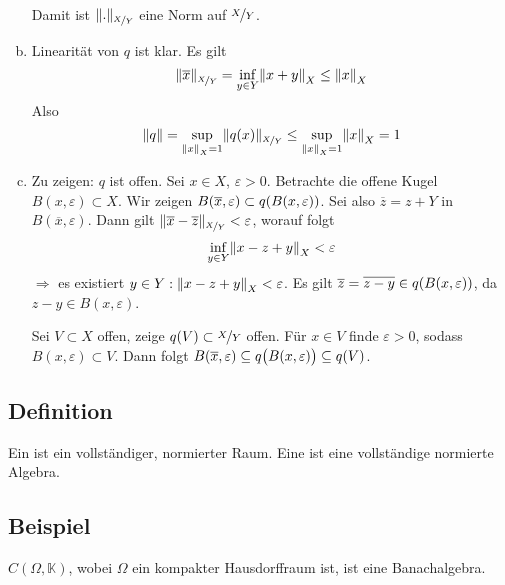\begin{enumerate}[a)]
\begin{align*}
	\end{align*}
	Damit ist $\norm[\nicefrac{X}{Y}]{.}$ eine Norm auf $\nicefrac{X}{Y}$.
	\item Linearität von $q$ ist klar. Es gilt
	\[
		\norm[\nicefrac{X}{Y}]{\overline{x}} = \inf_{y \in Y} \norm[X]{x+y} \le \norm[X]{x}   
	\]
	Also
	\[
		\norm{q} = \sup_{\norm[X]{x}=1} \norm[\nicefrac{X}{Y}]{q(x)} \le \sup_{\norm[X]{x}=1 } \norm[X]{x} = 1   
	\]
	\item Zu zeigen: $q$ ist offen. Sei $x \in X$, $\varepsilon>0$. Betrachte die offene Kugel $B(x,\varepsilon) \subset X$. Wir zeigen 
	$B(\overline{x}, \varepsilon) \subset q \enbrace*{B(x,\varepsilon)}$. Sei also $\overline{z} = z + Y$ in $B(\overline{x},\varepsilon)$. Dann gilt
	$\norm[\nicefrac{X}{Y}]{\overline{x}- \overline{z}} < \varepsilon$, worauf folgt
	\[
		\inf_{y \in Y} \norm[X]{x-z+y} < \varepsilon 
	\]
	$\Rightarrow$ es existiert $y \in Y : \norm[X]{x-z+y}<\varepsilon $. Es gilt $\overline{z}=\overline{z-y}\in q\enbrace*{B(x,\varepsilon)}$, da $z-y\in B(x,\varepsilon)$.
	
	Sei $V \subset X$ offen, zeige $q(V) \subset \nicefrac{X}{Y}$ offen. Für $x \in V$ finde $\varepsilon>0$, sodass $B(x,\varepsilon) \subset V$. Dann folgt
	$B(\overline{x},\varepsilon) \subseteq q \enbrace[\big]{ B(x,\varepsilon)} \subseteq q(V)$. \bewende
\end{enumerate}

\subsection[Definition: Banachraum und Banachalgebra]{Definition} %
\label{sub:214}
Ein  ist ein vollständiger, normierter Raum. Eine  ist eine vollständige normierte Algebra.  

\subsection[Beispiel für eine Banachalgebra]{Beispiel} %
\label{sub:215}
$C(\Omega, \mathds{K} )$, wobei $\Omega$ ein kompakter Hausdorffraum ist, ist eine Banachalgebra.

